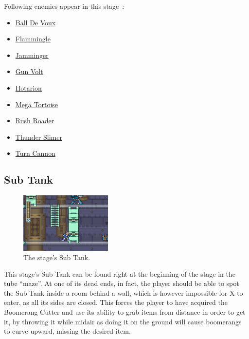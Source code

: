 Following enemies appear in this stage~\cite{wiki:Power_plant}:
\begin{itemize}
	\item \hyperlink{enem:Ball_De_Voux}{Ball De Voux}
	\item \hyperlink{enem:Flammingle}{Flammingle}
	\item \hyperlink{enem:Jamminger}{Jamminger}
	\item \hyperlink{enem:Gun_Volt}{Gun Volt}
	\item \hyperlink{enem:Hotarion}{Hotarion}
	\item \hyperlink{enem:Mega_Tortoise}{Mega Tortoise}
	\item \hyperlink{enem:Rush_Roader}{Rush Roader}
	\item \hyperlink{miniboss:Thunder_Slimer}{Thunder Slimer}
	\item \hyperlink{enem:Turn_Cannon}{Turn Cannon}
\end{itemize}

\subsection{Sub Tank}
\begin{figure}[htp]
	\centering
	\includegraphics[height=3cm]{figures/X1/Spark_mandrill/Mandrill_tank.jpg}
	\caption{The stage's Sub Tank.}
\end{figure}
This stage's Sub Tank can be found right at the beginning of the stage in the tube ``maze''. At one of its dead ends, in fact, the player should be able to spot the Sub Tank inside a room behind a wall, which is however impossible for X to enter, as all its sides are closed. This forces the player to have acquired the Boomerang Cutter and use its ability to grab items from distance in order to get it, by throwing it while midair as doing it on the ground will cause boomerangs to curve upward, missing the desired item.


